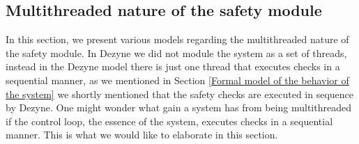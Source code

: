 \documentclass[12pt]{scrreprt}
\begin{document}
\subsection{Multithreaded nature of the safety module}
\label{Multithreaded nature of the safety module}

In this section, we present various models regarding the multithreaded nature of the safety module. In Dezyne we did not module the system as a set of threads, instead in the Dezyne model there is just one thread that executes checks in a sequential manner, as we mentioned in Section \ref{Formal model of the behavior of the system} we shortly mentioned that the safety checks are executed in sequence by Dezyne. One might wonder what gain a system has from being multithreaded if the control loop, the essence of the system, executes checks in a sequential manner. This is what we would like to elaborate in this section.
\par
\end{document}
